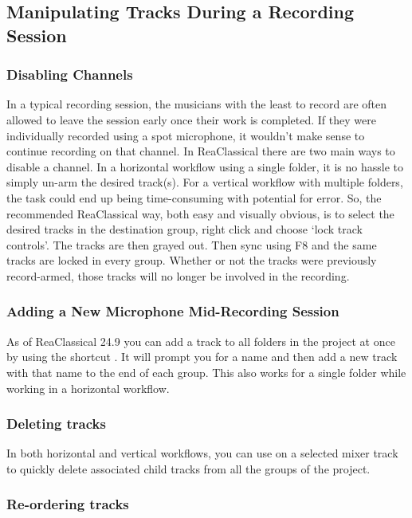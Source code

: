 \documentclass[10pt,american]{article}
\begin{document}
\subsection{Manipulating Tracks During a Recording Session}

\subsubsection{Disabling Channels}

In a typical recording session, the musicians with the least to record are often
allowed to leave the session early once their work is completed. If they were
individually recorded using a spot microphone, it wouldn't make sense to
continue recording on that channel. In ReaClassical there are two main ways to
disable a channel. In a horizontal workflow using a single folder, it is no
hassle to simply un-arm the desired track(s). For a vertical workflow with
multiple folders, the task could end up being time-consuming with potential for
error. So, the recommended ReaClassical way, both easy and visually obvious, is
to select the desired tracks in the destination group, right click and choose
`lock track controls'. The tracks are then grayed out. Then sync using F8 and
the same tracks are locked in every group. Whether or not the tracks were
previously record-armed, those tracks will no longer be involved in the
recording.

\subsubsection{Adding a New Microphone Mid-Recording Session}

As of ReaClassical 24.9 you can add a track to all folders in the project at
once by using the shortcut . It will prompt you for a name and
then add a new track with that name to the end of each group. This also works
for a single folder while working in a horizontal workflow.

\subsubsection{Deleting tracks}

In both horizontal and vertical workflows, you can use \keys{\ctrl+\shift+\del}
on a selected mixer track to quickly delete associated child tracks from all the
groups of the project.

\subsubsection{Re-ordering tracks}
\end{document}
